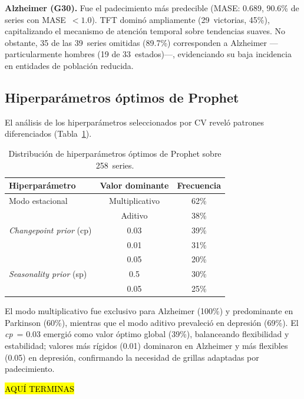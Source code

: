 \documentclass[12pt,a4paper]{article}
\begin{document}
\noindent\textbf{Alzheimer (G30).}
Fue el padecimiento más predecible (MASE: 0.689, 90.6\% de series con MASE~$< 1.0$). TFT dominó ampliamente (29~victorias, 45\%), capitalizando el mecanismo de atención temporal sobre tendencias suaves. No obstante, 35 de las 39~series omitidas (89.7\%) corresponden a Alzheimer ---particularmente hombres (19 de 33~estados)---, evidenciando su baja incidencia en entidades de población reducida.

\subsection*{Hiperparámetros óptimos de Prophet}

El análisis de los hiperparámetros seleccionados por CV reveló patrones diferenciados (Tabla~\ref{tab:hp_optimos}).

\begin{table}[ht]
\centering
\caption{Distribución de hiperparámetros óptimos de Prophet sobre 258~series.}
\label{tab:hp_optimos}
\begin{tabular}{@{}lcc@{}}
\toprule
\textbf{Hiperparámetro} & \textbf{Valor dominante} & \textbf{Frecuencia} \\
\midrule
Modo estacional       & Multiplicativo & 62\% \\
                      & Aditivo        & 38\% \\
\midrule
\textit{Changepoint prior} (cp)
                      & 0.03 & 39\% \\
                      & 0.01 & 31\% \\
                      & 0.05 & 20\% \\
\midrule
\textit{Seasonality prior} (sp)
                      & 0.5  & 30\% \\
                      & 0.05 & 25\% \\
\bottomrule
\end{tabular}
\end{table}

El modo multiplicativo fue exclusivo para Alzheimer (100\%) y predominante en Parkinson (60\%), mientras que el modo aditivo prevaleció en depresión (69\%). El \textit{cp}~= 0.03 emergió como valor óptimo global (39\%), balanceando flexibilidad y estabilidad; valores más rígidos (0.01) dominaron en Alzheimer y más flexibles (0.05) en depresión, confirmando la necesidad de grillas adaptadas por padecimiento.

\begin{center}
    \hl{AQUÍ TERMINAS}
\end{center}
\end{document}
